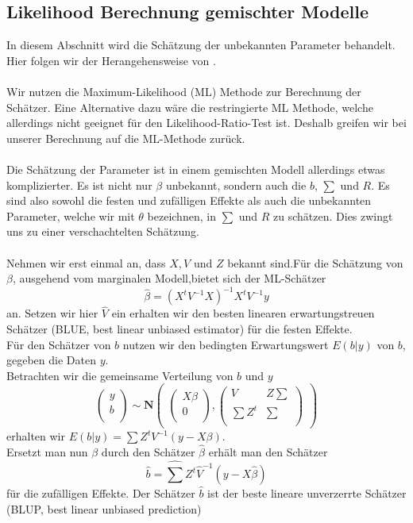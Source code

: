 \documentclass[%
thesis=student,%
coverpage=false,%
titlepage=false,%
headmarks=true, %
german,%
font=libertine, %
math=newpxtx, %
BCOR=5mm,%
coverBCOR=11mm%
]{tumbook}
\theoremstyle{break}
\begin{document}
\subsection{Likelihood Berechnung gemischter Modelle}
In diesem Abschnitt wird die Schätzung der unbekannten Parameter behandelt. Hier folgen wir der Herangehensweise von \cite{fahrmeir2010} .\\
\\
Wir nutzen die Maximum-Likelihood (ML) Methode zur Berechnung der Schätzer. Eine Alternative dazu wäre die restringierte ML Methode, welche allerdings nicht geeignet für den Likelihood-Ratio-Test ist. Deshalb greifen wir bei unserer Berechnung auf die ML-Methode zurück.\\
\\
Die Schätzung der Parameter ist in einem gemischten Modell allerdings etwas komplizierter. Es ist nicht nur $\beta$ unbekannt, sondern auch die $b$, $\sum$ und $R$. Es sind also sowohl die festen und zufälligen Effekte als auch die unbekannten Parameter, welche wir mit $\theta$ bezeichnen, in  $\sum$ und $R$ zu schätzen. Dies zwingt uns zu einer verschachtelten Schätzung.\\
\\
Nehmen wir erst einmal an, dass $X,V$ und $Z$ bekannt sind.Für die Schätzung von $\beta$, ausgehend vom marginalen Modell,bietet sich der ML-Schätzer $$\hat{\beta} = (X^t V^{-1}X)^{-1}X^t V^{-1}y$$ an. Setzen wir hier $\hat{V}$ ein erhalten wir den besten linearen erwartungstreuen Schätzer (BLUE, best linear unbiased estimator) für die festen Effekte. \\
Für den Schätzer von $b$ nutzen wir den bedingten Erwartungswert $E(b|y)$ von $b$, gegeben die Daten $y$. \\
Betrachten wir die gemeinsame Verteilung von $b$ und $y$ 
$$\begin{pmatrix}
	y \\
	b \\
\end{pmatrix}
\sim
\mathbf{N}
\begin{pmatrix}
	\begin{pmatrix}
		
		X\beta \\
		0 \\
	\end{pmatrix},
	\begin{pmatrix}
		V & Z\sum \\
		\sum Z^t & \sum \\
	\end{pmatrix}
\end{pmatrix}$$
erhalten wir $E(b|y) = \sum Z^tV^{-1}(y-X\beta)$. \\
Ersetzt man nun $\beta$ durch den Schätzer $\hat{\beta}$ erhält man den Schätzer $$\hat{b} = \hat{\sum} Z^t\hat{V}^{-1}(y-X\hat{\beta})$$ für die zufälligen Effekte. Der Schätzer $\hat{b}$ ist der beste lineare unverzerrte Schätzer (BLUP, best linear unbiased prediction)\\
\end{document}
